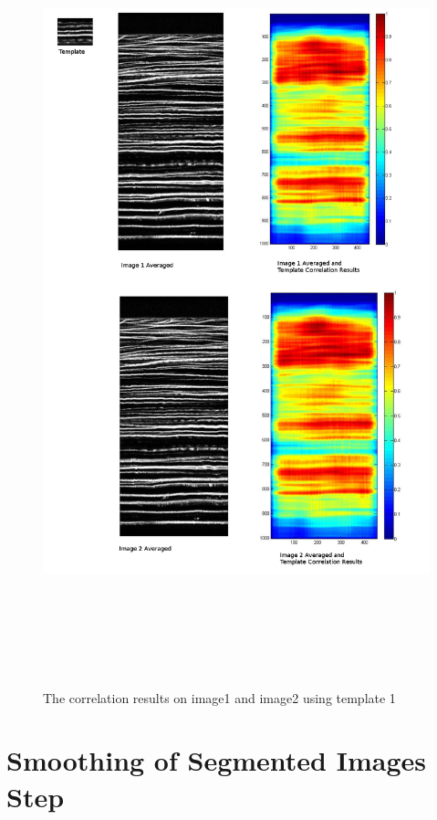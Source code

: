 \documentclass[11pt,psfig]{article}
\begin{document}
\begin{figure}[H]
\centering
\includegraphics[height=9in]{correlationResults_template2.jpg}
\caption{The correlation results on image1 and image2 using template 1}
\end{figure}

\section{Smoothing of Segmented Images Step}
\end{document}
